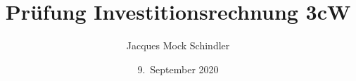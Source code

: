 
\date{9.\ September 2020}

\title{Prüfung Investitionsrechnung 3cW}

\author{Jacques Mock Schindler}
